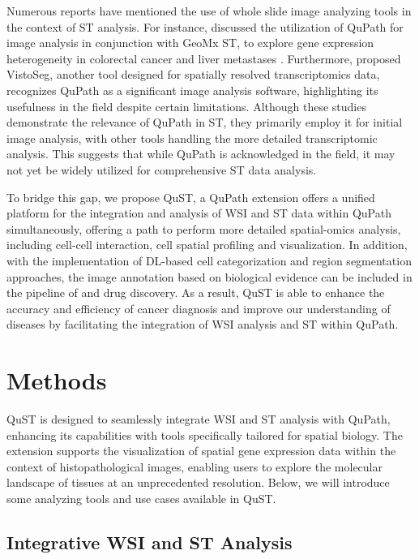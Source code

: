 \documentclass{article}
\begin{document}
Numerous reports have mentioned the use of whole slide image analyzing tools in the context of ST analysis. For instance, \cite{Wood:2023} discussed the utilization of QuPath for image analysis in conjunction with GeoMx ST, to explore gene expression heterogeneity in colorectal cancer and liver metastases . Furthermore, \cite{Tippani:2023} proposed VistoSeg, another tool designed for spatially resolved transcriptomics data, recognizes QuPath as a significant image analysis software, highlighting its usefulness in the field despite certain limitations. Although these studies demonstrate the relevance of QuPath in ST, they primarily employ it for initial image analysis, with other tools handling the more detailed transcriptomic analysis. This suggests that while QuPath is acknowledged in the field, it may not yet be widely utilized for comprehensive ST data analysis. 

To bridge this gap, we propose QuST, a QuPath extension offers a unified platform for the integration and analysis of WSI and ST data within QuPath simultaneously, offering a path to perform more detailed spatial-omics analysis, including cell-cell interaction, cell spatial profiling and visualization. In addition, with the implementation of DL-based cell categorization and region segmentation approaches, the image annotation based on biological evidence can be included in the pipeline of  and drug discovery. As a result, QuST is able to  enhance the accuracy and efficiency of cancer diagnosis and improve our understanding of diseases by facilitating the integration of WSI analysis and ST within QuPath.

\section{Methods}
\label{sec:methods}

QuST is designed to seamlessly integrate WSI and ST analysis with QuPath, enhancing its capabilities with tools specifically tailored for spatial biology. The extension supports the visualization of spatial gene expression data within the context of histopathological images, enabling users to explore the molecular landscape of tissues at an unprecedented resolution. Below, we will introduce some analyzing tools and use cases available in QuST.

\subsection{Integrative WSI and ST Analysis}
\label{sec:sptxanal}
	
\end{document}
